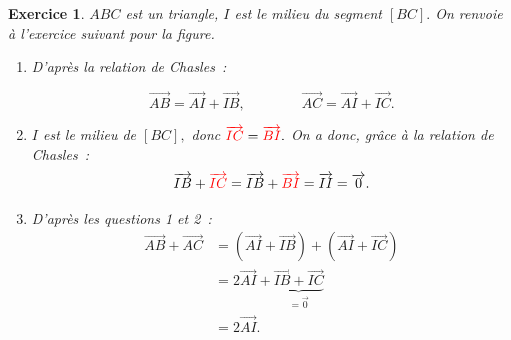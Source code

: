 \documentclass[10pt]{article}
\newtheorem{exo}{Exercice}
\begin{document}
\begin{exo}

$ABC$ est un triangle, $I$ est le milieu du segment $\left[BC\right].$ On renvoie à l'exercice suivant pour la figure.

\begin{enumerate}
\item D'après la relation de Chasles~:

\[\overrightarrow{AB}=\overrightarrow{AI}+\overrightarrow{IB},\qquad\qquad \overrightarrow{AC}=\overrightarrow{AI}+\overrightarrow{IC}. \]

\item $I$ est le milieu de $\left[BC\right],$ donc $\textcolor{red}{\overrightarrow{IC}}=\textcolor{red}{\overrightarrow{BI}}.$ On a donc, grâce à la relation de Chasles~:
 \[\overrightarrow{IB}+\textcolor{red}{\overrightarrow{IC}}=\overrightarrow{IB}+\textcolor{red}{\overrightarrow{BI}}=\overrightarrow{II}=\overrightarrow{0}.\]
\item D'après les questions 1 et 2~:
\begin{align*}
\overrightarrow{AB}+\overrightarrow{AC}&=\left(\overrightarrow{AI}+\overrightarrow{IB}\right)+\left(\overrightarrow{AI}+\overrightarrow{IC}\right)\\
&=2\overrightarrow{AI}+\underbrace{\overrightarrow{IB}+\overrightarrow{IC}}_{=\overrightarrow{0}}\\
&=2\overrightarrow{AI}.
\end{align*}
\end{enumerate}

\end{exo}
\end{document}
